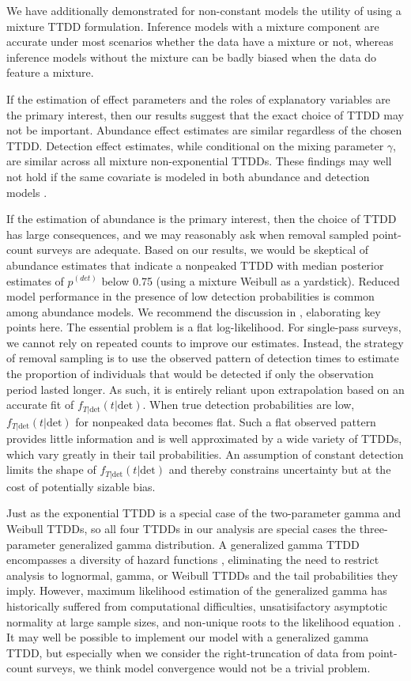 \documentclass[12pt]{article}
\newcommand{\pdet}{p^{(det)}}
\newcommand{\dt}{\text{det}}
\newcommand{\ftdt}{f_{T|\dt}(t|\dt)}
\begin{document}
We have additionally demonstrated for non-constant models the utility of using a mixture TTDD formulation.
Inference models with a mixture component are accurate under most scenarios whether the data have a mixture or not, whereas inference models without the mixture can be badly biased when the data do feature a mixture.  

If the estimation of effect parameters and the roles of explanatory variables are the primary interest, then our results suggest that the exact choice of TTDD may not be important.  
Abundance effect estimates are similar regardless of the chosen TTDD.
Detection effect estimates, while conditional on the mixing parameter $\gamma$, are similar across all mixture non-exponential TTDDs.  
These findings may well not hold if the same covariate is modeled in both abundance and detection models \citep{Kery2008}.

If the estimation of abundance is the primary interest, then the choice of TTDD has large consequences, and we may reasonably ask when removal sampled point-count surveys are adequate.
Based on our results, we would be skeptical of abundance estimates that indicate a nonpeaked TTDD with median posterior estimates of $\pdet$ below 0.75 (using a mixture Weibull as a yardstick).
Reduced model performance in the presence of low detection probabilities is common among abundance models.
We recommend the discussion in \citet{CoullAgresti1999}, elaborating key points here.
The essential problem is a flat log-likelihood.
For single-pass surveys, we cannot rely on repeated counts to improve our estimates.
Instead, the strategy of removal sampling is to use the observed pattern of detection times to estimate the proportion of individuals that would be detected if only the observation period lasted longer.  
As such, it is entirely reliant upon extrapolation based on an accurate fit of $\ftdt$.
When true detection probabilities are low, $\ftdt$ for nonpeaked data becomes flat.
Such a flat observed pattern provides little information and is well approximated by a wide variety of TTDDs, which vary greatly in their tail probabilities.
An assumption of constant detection limits the shape of $\ftdt$ and thereby constrains uncertainty but at the cost of potentially sizable bias.

Just as the exponential TTDD is a special case of the two-parameter gamma and Weibull TTDDs, so all four TTDDs in our analysis are special cases the three-parameter generalized gamma distribution.
A generalized gamma TTDD encompasses a diversity of hazard functions \citep{Cox2007}, 
eliminating the need to restrict analysis to lognormal, gamma, or Weibull TTDDs and the tail probabilities they imply.
However, maximum likelihood estimation of the generalized gamma has historically suffered from computational difficulties, unsatisifactory asymptotic normality at large sample sizes, and non-unique roots to the likelihood equation \citep{CoorayAnand2008, NoufailyJones2013}.
It may well be possible to implement our model with a generalized gamma TTDD, but especially when we consider the right-truncation of data from point-count surveys, we think model convergence would not be a trivial problem.
\end{document}
